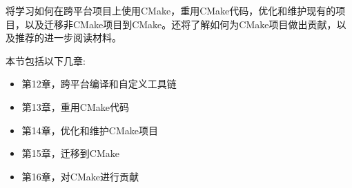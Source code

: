 将学习如何在跨平台项目上使用CMake，重用CMake代码，优化和维护现有的项目，以及迁移非CMake项目到CMake。还将了解如何为CMake项目做出贡献，以及推荐的进一步阅读材料。

本节包括以下几章:

\begin{itemize}
\item 第12章，跨平台编译和自定义工具链
\item 第13章，重用CMake代码
\item 第14章，优化和维护CMake项目
\item 第15章，迁移到CMake
\item 第16章，对CMake进行贡献
\end{itemize}